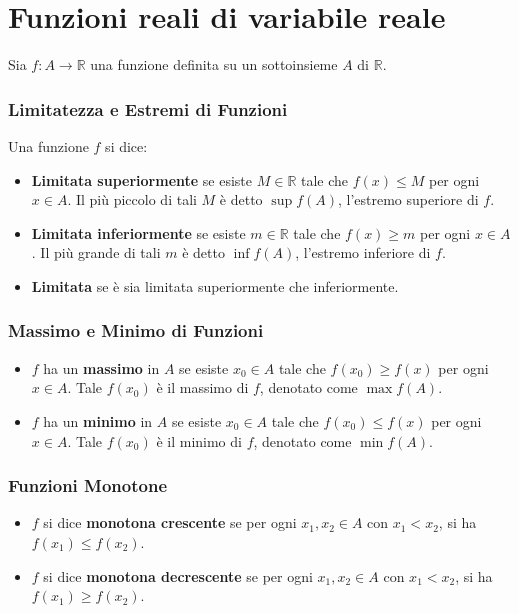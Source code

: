 \documentclass{book}
\begin{document}
\chapter{Funzioni reali di variabile reale}
Sia \( f: A \to \mathbb{R} \) una funzione definita su un sottoinsieme \( A \) di \( \mathbb{R} \).

\subsection*{Limitatezza e Estremi di Funzioni}
Una funzione \( f \) si dice:
\begin{itemize}
  \item \textbf{Limitata superiormente} se esiste \( M \in \mathbb{R} \) tale che \( f(x) \leq M \) per ogni \( x \in A \). Il più piccolo di tali \( M \) è detto \(\sup f(A)\), l'estremo superiore di \( f \).
  \item \textbf{Limitata inferiormente} se esiste \( m \in \mathbb{R} \) tale che \( f(x) \geq m \) per ogni \( x \in A \). Il più grande di tali \( m \) è detto \(\inf f(A)\), l'estremo inferiore di \( f \).
  \item \textbf{Limitata} se è sia limitata superiormente che inferiormente.
\end{itemize}

\subsection*{Massimo e Minimo di Funzioni}
\begin{itemize}
  \item \( f \) ha un \textbf{massimo} in \( A \) se esiste \( x_0 \in A \) tale che \( f(x_0) \geq f(x) \) per ogni \( x \in A \). Tale \( f(x_0) \) è il massimo di \( f \), denotato come \(\max f(A)\).
  \item \( f \) ha un \textbf{minimo} in \( A \) se esiste \( x_0 \in A \) tale che \( f(x_0) \leq f(x) \) per ogni \( x \in A \). Tale \( f(x_0) \) è il minimo di \( f \), denotato come \(\min f(A)\).
\end{itemize}

\subsection*{Funzioni Monotone}
\begin{itemize}
  \item \( f \) si dice \textbf{monotona crescente} se per ogni \( x_1, x_2 \in A \) con \( x_1 < x_2 \), si ha \( f(x_1) \leq f(x_2) \).
  \item \( f \) si dice \textbf{monotona decrescente} se per ogni \( x_1, x_2 \in A \) con \( x_1 < x_2 \), si ha \( f(x_1) \geq f(x_2) \).
\end{itemize}
\end{document}
